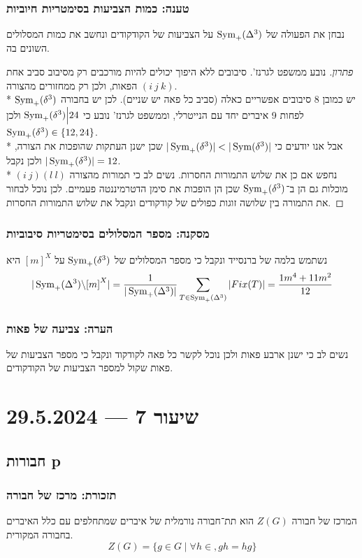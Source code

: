 \subsubsection{טענה: כמות הצביעות בסימטריות חיוביות}
נבחן את הפעולה של $\operatorname{Sym}_+(\Delta^3)$ על הצביעות של הקודקודים ונחשב את כמות המסלולים השונים בה.
\begin{proof}[פתרון]
	נובע ממשפט לגרנז'. סיבובים ללא היפוך יכולים להיות מורכבים רק מסיבוב סביב אחת הפאות, ולכן רק ממחזורים מהצורה $(i\ j\ k)$. \\*
	יש כמובן $8$ סיבובים אפשריים כאלה (סביב כל פאה יש שניים).
	לכן יש בחבורה $\operatorname{Sym}_+(\delta^3)$ לפחות 9 איברים יחד עם הנייטרלי, וממשפט לגרנז' נובע כי $\operatorname{Sym}_+(\delta^3) \Big| 24$ ולכן $\operatorname{Sym}_+(\delta^3) \in \{12, 24\}$. \\*
	אבל אנו יודעים כי $|\operatorname{Sym}_+(\delta^3)| < |\operatorname{Sym}(\delta^3)|$ שכן ישנן העתקות שהופכות את הצורה, ולכן נקבל $|\operatorname{Sym}_+(\delta^3)| = 12$. \\*
	נחפש אם כן את שלוש התמורות החסרות. נשים לב כי תמורות מהצורה $(i\ j)(l\ l)$ מוכלות גם הן ב־$\operatorname{Sym}_+(\delta^3)$ שכן הן הופכות את סימן הדטרמיננטה פעמיים.
	לכן נוכל לבחור את התמורה בין שלושה זוגות כפולים של קודקודים ונקבל את שלוש התמורות החסרות.
\end{proof}

\subsubsection{מסקנה: מספר המסלולים בסימטריות סיבוביות}
נשתמש בלמה של ברנסייד ונקבל כי מספר המסלולים של $\operatorname{Sym}_+(\delta^3)$ על ${[m]}^X$ היא
\[
	|\operatorname{Sym}_+(\Delta^3) \backslash {[m]}^X| = \frac{1}{|\operatorname{Sym}_+(\Delta^3)|} \sum_{T \in \operatorname{Sym}_+(\Delta^3)} |Fix(T)| = \frac{1m^4 + 11m^2}{12}
\]

\subsubsection{הערה: צביעה של פאות}
נשים לב כי ישנן ארבע פאות ולכן נוכל לקשר כל פאה לקודקוד ונקבל כי מספר הצביעות של פאות שקול למספר הצביעות של הקודקודים.

\section{שיעור 7 --- 29.5.2024}
\subsection{חבורות p}
\subsubsection{תזכורת: מרכז של חבורה}
המרכז של חבורה $Z(G)$ הוא תת־חבורה נורמלית של איברים שמתחלפים עם כלל האיברים בחבורה המקורית.
\[
	Z(G) = \{ g \in G \mid \forall h \in, g h = hg \}
\]

